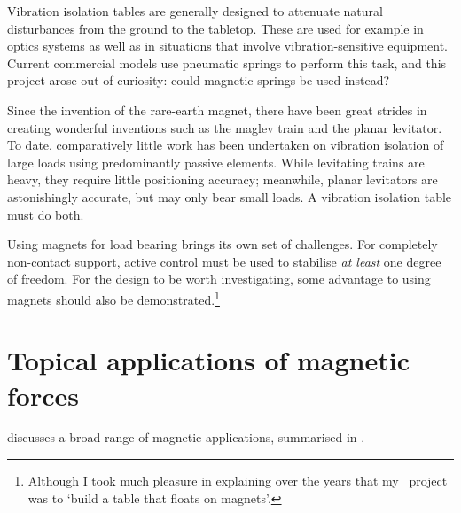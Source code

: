 Vibration isolation tables are generally designed to attenuate natural
disturbances from the ground to the tabletop. These are used for
example in optics systems as well as in situations that involve
vibration-sensitive equipment. Current commercial models use pneumatic
springs to perform this task, and this project arose out of curiosity:
could magnetic springs be used instead?

Since the invention of the rare-earth magnet, there have been great
strides in creating wonderful inventions such as the maglev train and
the planar levitator. To date, comparatively little work has been
undertaken on vibration isolation of large loads using predominantly
passive elements. While levitating trains are heavy, they require
little positioning accuracy; meanwhile, planar levitators are
astonishingly accurate, but may only bear small loads. A vibration
isolation table must do both.

Using magnets for load bearing brings its own set of challenges. For
completely non-contact support, active control must be used to
stabilise \emph{at least} one degree of freedom. For the design to be
worth investigating, some advantage to using magnets should also be
demonstrated.\footnote{Although I took much pleasure in explaining
  over the years that my \PhD\ project was to `build a table that
  floats on magnets'.}


\section{Topical applications of magnetic forces}

\textcite{coey2002} discusses a broad range of magnetic applications,
summarised in .

